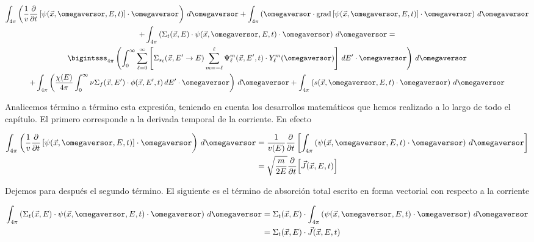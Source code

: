 \begin{multline}\label{eq:difusionporomega}
\int_{4\pi} \left( \frac{1}{v} \frac{\partial}{\partial t} \left[ \psi(\vec{x}, \omegaversor, E, t) \right] \cdot  \omegaversor \right) \, d\omegaversor
 +
\int_{4\pi} \left( \omegaversor \cdot \text{grad} \left[ \psi(\vec{x}, \omegaversor, E, t) \right] \cdot  \omegaversor \right) \, d\omegaversor
\\
 +
\int_{4\pi} \left( \Sigma_t(\vec{x}, E) \cdot \psi(\vec{x}, \omegaversor, E, t) \cdot  \omegaversor \right) \, d\omegaversor
 = 
\\
\bigintsss_{4\pi} \left( \int_{0}^{\infty} \sum_{\ell=0}^\infty  \left[ \Sigma_{s_\ell}(\vec{x}, E^{\prime} \rightarrow E) 
\sum_{m=-\ell}^{\ell} \Psi_\ell^m (\vec{x}, E^{\prime}, t) \cdot Y_\ell^{m}(\omegaversor)  \right] \, dE^{\prime}  \cdot  \omegaversor \right) \, d\omegaversor
\\
+ \int_{4\pi} \left( \frac{\chi(E)}{4\pi} \int_{0}^{\infty} \nu\Sigma_f(\vec{x}, E^\prime) \cdot \phi(\vec{x}, E^\prime, t) \, dE^\prime  \cdot  \omegaversor \right) \, d\omegaversor
+ \int_{4\pi} \left( s(\vec{x}, \omegaversor, E, t)  \cdot  \omegaversor \right) \, d\omegaversor
\end{multline}

Analicemos término a término esta expresión, teniendo en cuenta los desarrollos matemáticos que hemos realizado a lo largo de todo el capítulo. El primero corresponde a la derivada temporal de la corriente. En efecto

\begin{align}
\int_{4\pi} \left( \frac{1}{v} \frac{\partial}{\partial t} \left[ \psi(\vec{x}, \omegaversor, E, t) \right] \cdot  \omegaversor \right) \, d\omegaversor
& =
\frac{1}{v(E)} \frac{\partial}{\partial t}\left[ \int_{4\pi} \left( \psi(\vec{x}, \omegaversor, E, t) \cdot  \omegaversor \right) \, d\omegaversor \right]
\nonumber \\
& = \sqrt{\frac{m}{2E}} \frac{\partial}{\partial t}\Big[ \vec{J}(\vec{x}, E, t) \Big] \label{eq:difusion1}
\end{align}

\medskip

Dejemos para después el segundo término. El siguiente es el término de absorción total escrito en forma vectorial con respecto a la corriente

\begin{align}
\int_{4\pi} \left( \Sigma_t(\vec{x}, E) \cdot \psi(\vec{x}, \omegaversor, E, t) \cdot  \omegaversor \right) \, d\omegaversor
& =
\Sigma_t(\vec{x}, E) \cdot \int_{4\pi} \left( \psi(\vec{x}, \omegaversor, E, t) \cdot  \omegaversor \right) \, d\omegaversor \nonumber \\
& =
\Sigma_t(\vec{x}, E) \cdot \vec{J}(\vec{x}, E, t) \label{eq:difusion2}
\end{align}

